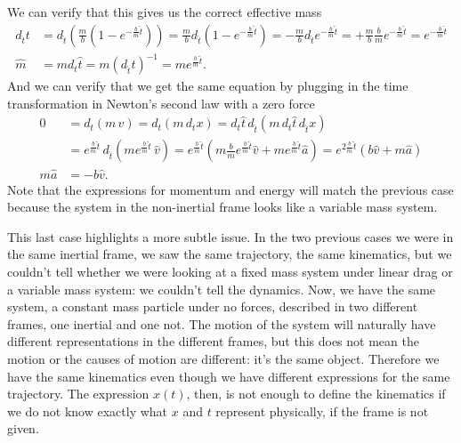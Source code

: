 We can verify that this gives us the correct effective mass
\begin{equation}
	\begin{aligned}
	d_{\hat{t}} t  &=d_{\hat{t}} \left( \frac{m}{b} (1-e^{-\frac{b}{m}\hat{t}}) \right) =\frac{m}{b} d_{\hat{t}} (1-e^{-\frac{b}{m}\hat{t}}) = - \frac{m}{b} d_{\hat{t}} e^{-\frac{b}{m}\hat{t}} = + \frac{m}{b} \frac{b}{m} e^{-\frac{b}{m}\hat{t}} = e^{-\frac{b}{m}\hat{t}} \\
	\hat{m} &= m d_t \hat{t} = m (d_{\hat{t}} t)^{-1} = m e^{\frac{b}{m}\hat{t}}.
	\end{aligned}
\end{equation}
And we can verify that we get the same equation by plugging in the time transformation in Newton's second law with a zero force
\begin{equation}
	\begin{aligned}
		0 &= d_t  (m \, v) = d_t  (m \, d_t x) = d_t \hat{t} \, d_{\hat{t}}  (m \, d_t \hat{t} \, d_{\hat{t}} x) \\ &= e^{\frac{b}{m}\hat{t}} \, d_{\hat{t}}  (m e^{\frac{b}{m}\hat{t}} \, \hat{v}) = e^{\frac{b}{m}\hat{t}} \left( m \frac{b}{m} e^{\frac{b}{m}\hat{t}} \hat{v} + m e^{\frac{b}{m}\hat{t}} \hat{a} \right)  = e^{2\frac{b}{m}\hat{t}} \left( b \hat{v} + m \hat{a} \right) \\
		m \hat{a} &= - b \hat{v}.
	\end{aligned}
\end{equation}
Note that the expressions for momentum and energy will match the previous case because the system in the non-inertial frame looks like a variable mass system.

This last case highlights a more subtle issue. In the two previous cases we were in the same inertial frame, we saw the same trajectory, the same kinematics, but we couldn't tell whether we were looking at a fixed mass system under linear drag or a variable mass system: we couldn't tell the dynamics. Now, we have the same system, a constant mass particle under no forces, described in two different frames, one inertial and one not. The motion of the system will naturally have different representations in the different frames, but this does not mean the motion or the causes of motion are different: it's the same object. Therefore we have the same kinematics even though we have different expressions for the same trajectory. The expression $x(t)$, then, is not enough to define the kinematics if we do not know exactly what $x$ and $t$ represent physically, if the frame is not given.

